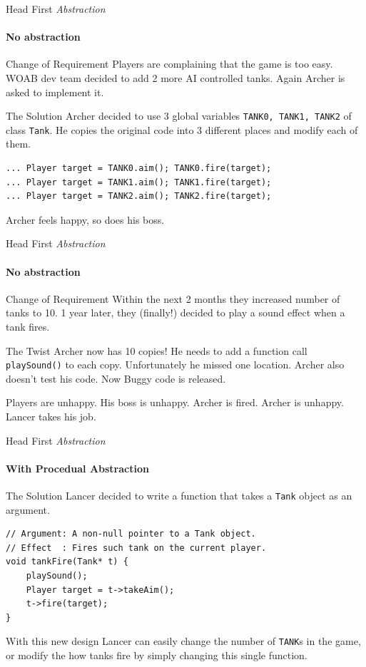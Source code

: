 \begin{frame}[fragile]{Head First \textit{Abstraction}}
	\framesubtitle{No abstraction}
	\begin{block}{Change of Requirement}
		Players are complaining that the game is too easy. WOAB dev team decided to add 2 more AI controlled tanks. Again Archer is asked to implement it.
	\end{block}
	\begin{block}{The Solution}
		Archer decided to use 3 global variables \texttt{TANK0, TANK1, TANK2} of class \texttt{Tank}. He copies the original code into 3 different places and modify each of them.
		\begin{verbatim}
... Player target = TANK0.aim(); TANK0.fire(target);
... Player target = TANK1.aim(); TANK1.fire(target);
... Player target = TANK2.aim(); TANK2.fire(target);
		\end{verbatim}
		Archer feels happy, so does his boss.
	\end{block}
\end{frame}

\begin{frame}[fragile]{Head First \textit{Abstraction}}
	\framesubtitle{No abstraction}
	\begin{block}{Change of Requirement}
		Within the next 2 months they increased number of tanks to 10. 1 year later, they (finally!) decided to play a sound effect when a tank fires. 
	\end{block}
	\begin{block}{The Twist}
		Archer now has 10 copies! He needs to add a function call \texttt{playSound()} to each copy. Unfortunately he missed one location.  Archer also doesn't test his code.  Now Buggy code is released.
		
		Players are unhappy. His boss is unhappy. Archer is fired. Archer is unhappy. Lancer takes his job.
	\end{block}
\end{frame}

\begin{frame}[fragile]{Head First \textit{Abstraction}}
	\framesubtitle{With Procedual Abstraction}
	\begin{block}{The Solution}
		Lancer decided to write a function that takes a \texttt{Tank} object as an argument.
		\begin{verbatim}
// Argument: A non-null pointer to a Tank object.
// Effect  : Fires such tank on the current player.
void tankFire(Tank* t) {
    playSound();
    Player target = t->takeAim(); 
    t->fire(target);
}
		\end{verbatim}
		With this new design Lancer can easily change the number of \texttt{TANK}s in the game, or modify the how tanks fire by simply changing this single function.
	\end{block}
\end{frame}

